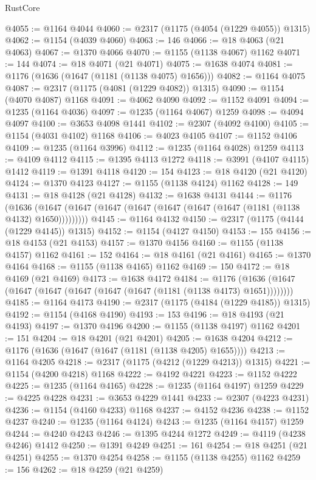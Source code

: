 \begin{lexlean}{RustCore}
\begin{coremodule}
@4055 := @1164 @4044
@4060 := @2317 (@1175 (@4054 (@1229 @4055)) @1315)
@4062 := @1154 (@4039 @4060)
@4063 := 146
@4066 := @18 @4063 (@21 @4063)
@4067 := @1370 @4066
@4070 := @1155 (@1138 @4067) @1162
@4071 := 144
@4074 := @18 @4071 (@21 @4071)
@4075 := @1638 @4074
@4081 := @1176 (@1636 (@1647 (@1181 (@1138 @4075) @1656)))
@4082 := @1164 @4075
@4087 := @2317 (@1175 (@4081 (@1229 @4082)) @1315)
@4090 := @1154 (@4070 @4087) @1168
@4091 := @4062 @4090
@4092 := @1152 @4091
@4094 := @1235 (@1164 @4036)
@4097 := @1235 (@1164 @4067) @1259
@4098 := @4094 @4097
@4100 := @3653 @4098 @1441
@4102 := @2307 (@4092 @4100)
@4105 := @1154 (@4031 @4102) @1168
@4106 := @4023 @4105
@4107 := @1152 @4106
@4109 := @1235 (@1164 @3996)
@4112 := @1235 (@1164 @4028) @1259
@4113 := @4109 @4112
@4115 := @1395 @4113 @1272
@4118 := @3991 (@4107 @4115) @1412
@4119 := @1391 @4118
@4120 := 154
@4123 := @18 @4120 (@21 @4120)
@4124 := @1370 @4123
@4127 := @1155 (@1138 @4124) @1162
@4128 := 149
@4131 := @18 @4128 (@21 @4128)
@4132 := @1638 @4131
@4144 := @1176
    (@1636 (@1647 (@1647 (@1647 (@1647 (@1647 (@1647 (@1647 (@1181 (@1138 @4132) @1650)))))))))
@4145 := @1164 @4132
@4150 := @2317 (@1175 (@4144 (@1229 @4145)) @1315)
@4152 := @1154 (@4127 @4150)
@4153 := 155
@4156 := @18 @4153 (@21 @4153)
@4157 := @1370 @4156
@4160 := @1155 (@1138 @4157) @1162
@4161 := 152
@4164 := @18 @4161 (@21 @4161)
@4165 := @1370 @4164
@4168 := @1155 (@1138 @4165) @1162
@4169 := 150
@4172 := @18 @4169 (@21 @4169)
@4173 := @1638 @4172
@4184 := @1176 (@1636 (@1647 (@1647 (@1647 (@1647 (@1647 (@1647 (@1181 (@1138 @4173) @1651))))))))
@4185 := @1164 @4173
@4190 := @2317 (@1175 (@4184 (@1229 @4185)) @1315)
@4192 := @1154 (@4168 @4190)
@4193 := 153
@4196 := @18 @4193 (@21 @4193)
@4197 := @1370 @4196
@4200 := @1155 (@1138 @4197) @1162
@4201 := 151
@4204 := @18 @4201 (@21 @4201)
@4205 := @1638 @4204
@4212 := @1176 (@1636 (@1647 (@1647 (@1181 (@1138 @4205) @1655))))
@4213 := @1164 @4205
@4218 := @2317 (@1175 (@4212 (@1229 @4213)) @1315)
@4221 := @1154 (@4200 @4218) @1168
@4222 := @4192 @4221
@4223 := @1152 @4222
@4225 := @1235 (@1164 @4165)
@4228 := @1235 (@1164 @4197) @1259
@4229 := @4225 @4228
@4231 := @3653 @4229 @1441
@4233 := @2307 (@4223 @4231)
@4236 := @1154 (@4160 @4233) @1168
@4237 := @4152 @4236
@4238 := @1152 @4237
@4240 := @1235 (@1164 @4124)
@4243 := @1235 (@1164 @4157) @1259
@4244 := @4240 @4243
@4246 := @1395 @4244 @1272
@4249 := @4119 (@4238 @4246) @1412
@4250 := @1391 @4249
@4251 := 161
@4254 := @18 @4251 (@21 @4251)
@4255 := @1370 @4254
@4258 := @1155 (@1138 @4255) @1162
@4259 := 156
@4262 := @18 @4259 (@21 @4259)

\end{coremodule}
\end{lexlean}
